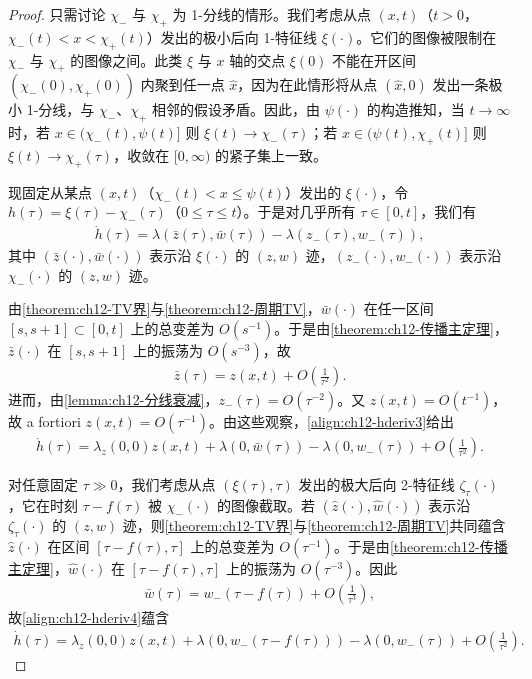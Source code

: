 \documentclass[../../main.tex]{subfiles}
\begin{document}
\begin{proof}
只需讨论 $\chi_-$ 与 $\chi_+$ 为 1-分线的情形。我们考虑从点 $(x,t)$（$t>0$，$\chi_-(t)<x<\chi_+(t)$）发出的极小后向 1-特征线 $\xi(\cdot)$。它们的图像被限制在 $\chi_-$ 与 $\chi_+$ 的图像之间。此类 $\xi$ 与 $x$ 轴的交点 $\xi(0)$ 不能在开区间 $(\chi_-(0),\chi_+(0))$ 内聚到任一点 $\hat x$，因为在此情形将从点 $(\hat x,0)$ 发出一条极小 1-分线，与 $\chi_-$、$\chi_+$ 相邻的假设矛盾。因此，由 $\psi(\cdot)$ 的构造推知，当 $t\to\infty$ 时，若 $x\in(\chi_-(t),\psi(t)]$ 则 $\xi(t)\to\chi_-(\tau)$；若 $x\in(\psi(t),\chi_+(t)]$ 则 $\xi(t)\to\chi_+(\tau)$，收敛在 $[0,\infty)$ 的紧子集上一致。

现固定从某点 $(x,t)$（$\chi_-(t)<x\leqslant\psi(t)$）发出的 $\xi(\cdot)$，令 $h(\tau)=\xi(\tau)-\chi_-(\tau)$（$0\leqslant\tau\leqslant t$）。于是对几乎所有 $\tau\in[0,t]$，我们有
\begin{align}
\dot h(\tau)=\lambda(\bar z(\tau),\bar w(\tau))-\lambda(z_-(\tau),w_-(\tau)),
\label{align:ch12-hderiv3}
\end{align}
其中 $(\bar z(\cdot),\bar w(\cdot))$ 表示沿 $\xi(\cdot)$ 的 $(z,w)$ 迹，$(z_-(\cdot),w_-(\cdot))$ 表示沿 $\chi_-(\cdot)$ 的 $(z,w)$ 迹。

由\cref{theorem:ch12-TV界}与\cref{theorem:ch12-周期TV}，$\bar w(\cdot)$ 在任一区间 $[s,s+1]\subset[0,t]$ 上的总变差为 $O(s^{-1})$。于是由\cref{theorem:ch12-传播主定理}，$\bar z(\cdot)$ 在 $[s,s+1]$ 上的振荡为 $O(s^{-3})$，故
\begin{align}
\bar z(\tau)=z(x,t)+O\left(\frac1{\tau^2}\right).
\label{align:ch12-zbar}
\end{align}
进而，由\cref{lemma:ch12-分线衰减}，$z_-(\tau)=O(\tau^{-2})$。又 $z(x,t)=O(t^{-1})$，故 a fortiori $z(x,t)=O(\tau^{-1})$。由这些观察，\eqref{align:ch12-hderiv3}给出
\begin{align}
\dot h(\tau)=\lambda_z(0,0)z(x,t)+\lambda(0,\bar w(\tau))-\lambda(0,w_-(\tau))+O\left(\frac1{\tau^2}\right).
\label{align:ch12-hderiv4}
\end{align}

对任意固定 $\tau\gg0$，我们考虑从点 $(\xi(\tau),\tau)$ 发出的极大后向 2-特征线 $\zeta_\tau(\cdot)$，它在时刻 $\tau-f(\tau)$ 被 $\chi_-(\cdot)$ 的图像截取。若 $(\hat z(\cdot),\hat w(\cdot))$ 表示沿 $\zeta_\tau(\cdot)$ 的 $(z,w)$ 迹，则\cref{theorem:ch12-TV界}与\cref{theorem:ch12-周期TV}共同蕴含 $\hat z(\cdot)$ 在区间 $[\tau-f(\tau),\tau]$ 上的总变差为 $O(\tau^{-1})$。于是由\cref{theorem:ch12-传播主定理}，$\hat w(\cdot)$ 在 $[\tau-f(\tau),\tau]$ 上的振荡为 $O(\tau^{-3})$。因此
\begin{align}
\bar w(\tau)=w_-(\tau-f(\tau))+O\left(\frac1{\tau^3}\right),
\label{align:ch12-wbar}
\end{align}
故\eqref{align:ch12-hderiv4}蕴含
\begin{align}
\dot h(\tau)=\lambda_z(0,0)z(x,t)+\lambda(0,w_-(\tau-f(\tau)))-\lambda(0,w_-(\tau))+O\left(\frac1{\tau^2}\right).
\label{align:ch12-hderiv5}
\end{align}


\end{proof}
\end{document}
